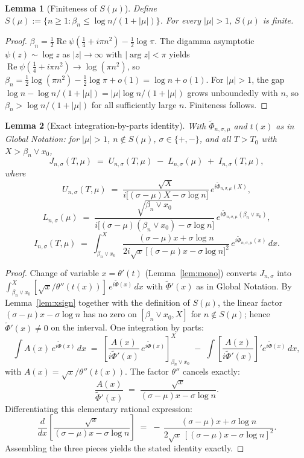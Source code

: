 \documentclass[11pt]{article}
\newtheorem{lemma}{Lemma}
\DeclareMathOperator{\ReOp}{Re}
\let\Re\ReOp
\begin{document}
\begin{lemma}[Finiteness of $S(\mu)$]\label{lem:Sfinite}
Define $S(\mu) := \{n\ge 1 : \beta_{n}\le \log n/(1+|\mu|)\}$. For every $|\mu|>1$, $S(\mu)$ is finite.
\end{lemma}

\begin{proof}
$\beta_{n} = \tfrac12\Re\psi(\tfrac14 + i\pi n^{2}) - \tfrac12\log\pi$. The digamma asymptotic $\psi(z)\sim\log z$ as $|z|\to\infty$ with $|\arg z|<\pi$ yields $\Re\psi(\tfrac14+i\pi n^{2})\to\log(\pi n^{2})$, so $\beta_{n} = \tfrac12\log(\pi n^{2}) - \tfrac12\log\pi + o(1) = \log n + o(1)$. For $|\mu|>1$, the gap $\log n - \log n/(1+|\mu|) = |\mu|\log n/(1+|\mu|)$ grows unboundedly with $n$, so $\beta_{n}>\log n/(1+|\mu|)$ for all sufficiently large $n$. Finiteness follows.
\end{proof}

\begin{lemma}[Exact integration-by-parts identity]\label{lem:ibp}
With $\widetilde\Phi_{n,\sigma,\mu}$ and $t(x)$ as in Global Notation: for $|\mu|>1$, $n\notin S(\mu)$, $\sigma\in\{+,-\}$, and all $T>T_{0}$ with $X>\beta_{n}\vee x_{0}$,
\[
J_{n,\sigma}(T,\mu) \;=\; U_{n,\sigma}(T,\mu) \;-\; L_{n,\sigma}(\mu) \;+\; I_{n,\sigma}(T,\mu),
\]
where
\[
U_{n,\sigma}(T,\mu) \;=\; \frac{\sqrt{X}}{i\bigl[(\sigma-\mu)X-\sigma\log n\bigr]}\,e^{i\widetilde\Phi_{n,\sigma,\mu}(X)},
\]
\[
L_{n,\sigma}(\mu) \;=\; \frac{\sqrt{\beta_{n}\vee x_{0}}}{i\bigl[(\sigma-\mu)(\beta_{n}\vee x_{0})-\sigma\log n\bigr]}\,e^{i\widetilde\Phi_{n,\sigma,\mu}(\beta_{n}\vee x_{0})},
\]
\[
I_{n,\sigma}(T,\mu) \;=\; \int_{\beta_{n}\vee x_{0}}^{X}\!\frac{(\sigma-\mu)x+\sigma\log n}{2i\sqrt{x}\,\bigl[(\sigma-\mu)x-\sigma\log n\bigr]^{2}}\, e^{i\widetilde\Phi_{n,\sigma,\mu}(x)}\,dx.
\]
\end{lemma}

\begin{proof}
Change of variable $x = \theta'(t)$ (Lemma~\ref{lem:mono}) converts $J_{n,\sigma}$ into $\int_{\beta_{n}\vee x_{0}}^{X}[\sqrt{x}/\theta''(t(x))]\,e^{i\widetilde\Phi(x)}\,dx$ with $\widetilde\Phi'(x)$ as in Global Notation. By Lemma~\ref{lem:xsign} together with the definition of $S(\mu)$, the linear factor $(\sigma-\mu)x-\sigma\log n$ has no zero on $[\beta_{n}\vee x_{0},X]$ for $n\notin S(\mu)$; hence $\widetilde\Phi'(x)\ne 0$ on the interval. One integration by parts:
\[
\int A(x)\,e^{i\widetilde\Phi(x)}\,dx \;=\; \left[\frac{A(x)}{i\widetilde\Phi'(x)}\,e^{i\widetilde\Phi(x)}\right]_{\beta_{n}\vee x_{0}}^{X} \;-\; \int\!\left[\frac{A(x)}{i\widetilde\Phi'(x)}\right]'\!e^{i\widetilde\Phi(x)}\,dx,
\]
with $A(x) = \sqrt{x}/\theta''(t(x))$. The factor $\theta''$ cancels exactly:
\[
\frac{A(x)}{\widetilde\Phi'(x)} \;=\; \frac{\sqrt{x}}{(\sigma-\mu)x-\sigma\log n}.
\]
Differentiating this elementary rational expression:
\[
\frac{d}{dx}\!\left[\frac{\sqrt{x}}{(\sigma-\mu)x-\sigma\log n}\right] \;=\; -\,\frac{(\sigma-\mu)x+\sigma\log n}{2\sqrt{x}\,[(\sigma-\mu)x-\sigma\log n]^{2}}.
\]
Assembling the three pieces yields the stated identity exactly.
\end{proof}
\end{document}
